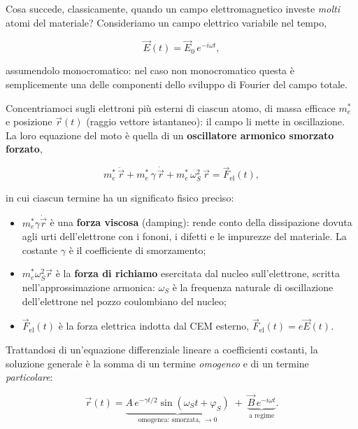 Cosa succede, classicamente, quando un campo elettromagnetico investe \emph{molti} atomi del materiale? Consideriamo un campo elettrico variabile nel tempo,

\begin{equation}
    \vec{E}(t) = \vec{E}_0 \, e^{-i \omega t},
\end{equation}

assumendolo monocromatico: nel caso non monocromatico questa è semplicemente una delle componenti dello sviluppo di Fourier del campo totale.

Concentriamoci sugli elettroni più esterni di ciascun atomo, di massa efficace \( m_e^{*} \) e posizione \( \vec{r}(t) \) (raggio vettore istantaneo): il campo li mette in oscillazione. La loro equazione del moto è quella di un \textbf{oscillatore armonico smorzato forzato},

\begin{importantbox}
    \begin{equation}
        m_e^{*} \, \ddot{\vec{r}} + m_e^{*} \, \gamma \, \dot{\vec{r}} + m_e^{*} \, \omega_S^{2} \, \vec{r} = \vec{F}_{\text{el}}(t),
    \end{equation}
\end{importantbox}

in cui ciascun termine ha un significato fisico preciso:

\begin{itemize}
    \item \( m_e^{*} \gamma \dot{\vec{r}} \) è una \textbf{forza viscosa} (damping): rende conto della dissipazione dovuta agli urti dell'elettrone con i fononi, i difetti e le impurezze del materiale. La costante \( \gamma \) è il coefficiente di smorzamento;
    \item \( m_e^{*} \omega_S^{2} \vec{r} \) è la \textbf{forza di richiamo} esercitata dal nucleo sull'elettrone, scritta nell'approssimazione armonica: \( \omega_S \) è la frequenza naturale di oscillazione dell'elettrone nel pozzo coulombiano del nucleo;
    \item \( \vec{F}_{\text{el}}(t) \) è la forza elettrica indotta dal CEM esterno, \( \vec{F}_{\text{el}}(t) = e \vec{E}(t) \).
\end{itemize}

Trattandosi di un'equazione differenziale lineare a coefficienti costanti, la soluzione generale è la somma di un termine \emph{omogeneo} e di un termine \emph{particolare}:

\begin{equation}
    \vec{r}(t) = \underbrace{A \, e^{-\gamma t / 2} \sin(\omega_S t + \varphi_S)}_{\text{omogenea: smorzata, } \to 0} \;+\; \underbrace{\vec{B} \, e^{-i \omega t}}_{\text{a regime}}.
\end{equation}

